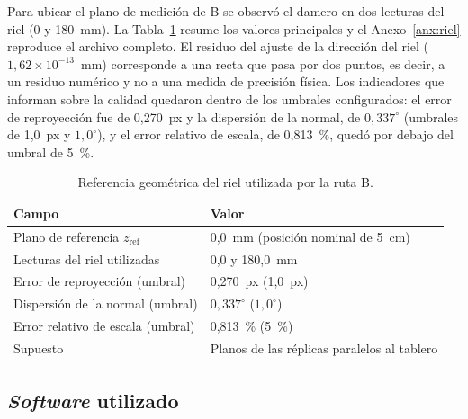 Para ubicar el plano de medición de B se observó el damero en dos lecturas del riel (0 y 180~mm). La Tabla~\ref{tab:riel} resume los valores principales y el Anexo~\ref{anx:riel} reproduce el archivo completo. El residuo del ajuste de la dirección del riel ($1{,}62 \times 10^{-13}$~mm) corresponde a una recta que pasa por dos puntos, es decir, a un residuo numérico y no a una medida de precisión física. Los indicadores que informan sobre la calidad quedaron dentro de los umbrales configurados: el error de reproyección fue de 0,270~px y la dispersión de la normal, de $0{,}337^{\circ}$ (umbrales de 1,0~px y $1{,}0^{\circ}$), y el error relativo de escala, de 0,813~\%, quedó por debajo del umbral de 5~\%.

\begin{table}[H]
\centering\small
\caption{Referencia geométrica del riel utilizada por la ruta B.}
\label{tab:riel}
\begin{tabular}{@{}p{6cm}p{7cm}@{}}
\toprule
Campo & Valor \\
\midrule
Plano de referencia $z_{\mathrm{ref}}$ & 0,0~mm (posición nominal de 5~cm) \\
Lecturas del riel utilizadas & 0,0 y 180,0~mm \\
Error de reproyección (umbral) & 0,270~px (1,0~px) \\
Dispersión de la normal (umbral) & $0{,}337^{\circ}$ ($1{,}0^{\circ}$) \\
Error relativo de escala (umbral) & 0,813~\% (5~\%) \\
Supuesto & Planos de las réplicas paralelos al tablero \\
\bottomrule
\end{tabular}
\end{table}

\subsection{\emph{Software} utilizado}
\label{sec:software}


